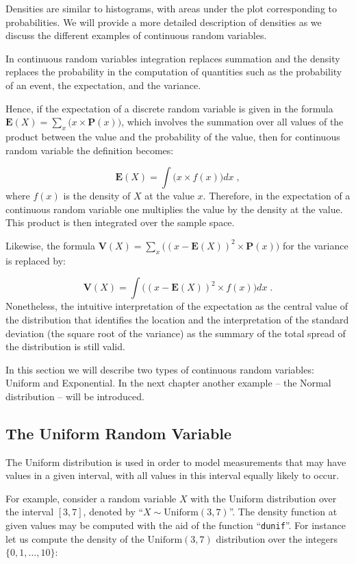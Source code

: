 \documentclass[]{krantz}
\newcommand{\Expec}{\mathbf{E}}
\newcommand{\Prob}{\mathbf{P}}
\newcommand{\Var}{\mathbf{V}}
\theoremstyle{definition}
\theoremstyle{definition}
\theoremstyle{definition}
\theoremstyle{remark}
\begin{document}
Densities are similar to histograms, with areas under the plot
corresponding to probabilities. We will provide a more detailed
description of densities as we discuss the different examples of
continuous random variables.

In continuous random variables integration replaces summation and the
density replaces the probability in the computation of quantities such
as the probability of an event, the expectation, and the variance.

Hence, if the expectation of a discrete random variable is given in the
formula \(\Expec(X) = \sum_x \big(x \times \Prob(x)\big)\), which involves
the summation over all values of the product between the value and the
probability of the value, then for continuous random variable the
definition becomes:

\[\Expec(X) = \int \big(x \times f(x)\big)dx\;,\]
where \(f(x)\) is the density of \(X\) at the value \(x\). Therefore, in the
expectation of a continuous random variable one multiplies the value by
the density at the value. This product is then integrated over the
sample space.

Likewise, the formula
\(\Var(X) = \sum_x\big( (x-\Expec(X))^2 \times \Prob(x)\big)\) for the
variance is replaced by:

\[\Var(X) =\int\big((x-\Expec(X))^2 \times f(x) \big) dx\;.\]
Nonetheless, the intuitive interpretation of the expectation as the
central value of the distribution that identifies the location and the
interpretation of the standard deviation (the square root of the
variance) as the summary of the total spread of the distribution is
still valid.

In this section we will describe two types of continuous random
variables: Uniform and Exponential. In the next chapter another example
-- the Normal distribution -- will be introduced.

\hypertarget{the-uniform-random-variable}{%
\subsection{The Uniform Random Variable}\label{the-uniform-random-variable}}

The Uniform distribution is used in order to model measurements that may
have values in a given interval, with all values in this interval
equally likely to occur.

For example, consider a random variable \(X\) with the Uniform
distribution over the interval \([3,7]\), denoted by
``\(X \sim \mathrm{Uniform}(3,7)\)''. The density function at given values
may be computed with the aid of the function ``\texttt{dunif}''. For instance let
us compute the density of the \(\mathrm{Uniform}(3,7)\) distribution over
the integers \(\{0, 1, \ldots, 10\}\):
\end{document}
